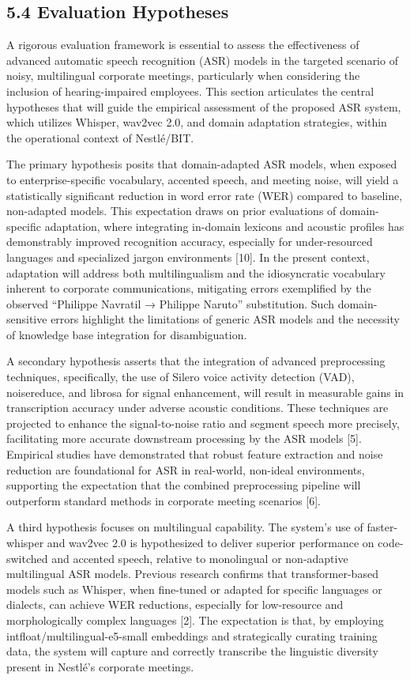\documentclass[12pt,a4paper]{article}
\begin{document}
\subsection{5.4 Evaluation Hypotheses}


A rigorous evaluation framework is essential to assess the effectiveness of advanced automatic speech recognition (ASR) models in the targeted scenario of noisy, multilingual corporate meetings, particularly when considering the inclusion of hearing-impaired employees. This section articulates the central hypotheses that will guide the empirical assessment of the proposed ASR system, which utilizes Whisper, wav2vec 2.0, and domain adaptation strategies, within the operational context of Nestlé/BIT.


The primary hypothesis posits that domain-adapted ASR models, when exposed to enterprise-specific vocabulary, accented speech, and meeting noise, will yield a statistically significant reduction in word error rate (WER) compared to baseline, non-adapted models. This expectation draws on prior evaluations of domain-specific adaptation, where integrating in-domain lexicons and acoustic profiles has demonstrably improved recognition accuracy, especially for under-resourced languages and specialized jargon environments [10]. In the present context, adaptation will address both multilingualism and the idiosyncratic vocabulary inherent to corporate communications, mitigating errors exemplified by the observed “Philippe Navratil → Philippe Naruto” substitution. Such domain-sensitive errors highlight the limitations of generic ASR models and the necessity of knowledge base integration for disambiguation.


A secondary hypothesis asserts that the integration of advanced preprocessing techniques, specifically, the use of Silero voice activity detection (VAD), noisereduce, and librosa for signal enhancement, will result in measurable gains in transcription accuracy under adverse acoustic conditions. These techniques are projected to enhance the signal-to-noise ratio and segment speech more precisely, facilitating more accurate downstream processing by the ASR models [5]. Empirical studies have demonstrated that robust feature extraction and noise reduction are foundational for ASR in real-world, non-ideal environments, supporting the expectation that the combined preprocessing pipeline will outperform standard methods in corporate meeting scenarios [6].


A third hypothesis focuses on multilingual capability. The system’s use of faster-whisper and wav2vec 2.0 is hypothesized to deliver superior performance on code-switched and accented speech, relative to monolingual or non-adaptive multilingual ASR models. Previous research confirms that transformer-based models such as Whisper, when fine-tuned or adapted for specific languages or dialects, can achieve WER reductions, especially for low-resource and morphologically complex languages [2]. The expectation is that, by employing intfloat/multilingual-e5-small embeddings and strategically curating training data, the system will capture and correctly transcribe the linguistic diversity present in Nestlé’s corporate meetings.
\end{document}
